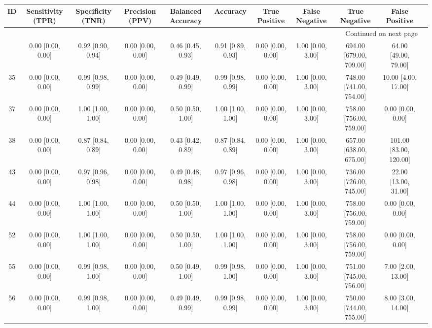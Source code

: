 \documentclass[8pt]{article}
\begin{document}
\begin{center}
\begin{footnotesize}
\begin{longtable}{|ccccccccccc|}
\toprule
 ID &  Sensitivity (TPR) &  Specificity (TNR) &    Precision (PPV) &  Balanced Accuracy &           Accuracy &      True Positive &     False Negative &            True Negative &          False Positive \\
\midrule
\endhead
\midrule
\multicolumn{10}{r}{{Continued on next page}} \\
\midrule
\endfoot

\bottomrule
\endlastfoot
 33 &  0.00 [0.00, 0.00] &  0.92 [0.90, 0.94] &  0.00 [0.00, 0.00] &  0.46 [0.45, 0.93] &  0.91 [0.89, 0.93] &  0.00 [0.00, 0.00] &  1.00 [0.00, 3.00] &  694.00 [679.00, 709.00] &    64.00 [49.00, 79.00] \\
 35 &  0.00 [0.00, 0.00] &  0.99 [0.98, 0.99] &  0.00 [0.00, 0.00] &  0.49 [0.49, 0.99] &  0.99 [0.98, 0.99] &  0.00 [0.00, 0.00] &  1.00 [0.00, 3.00] &  748.00 [741.00, 754.00] &     10.00 [4.00, 17.00] \\
 37 &  0.00 [0.00, 0.00] &  1.00 [1.00, 1.00] &  0.00 [0.00, 0.00] &  0.50 [0.50, 1.00] &  1.00 [1.00, 1.00] &  0.00 [0.00, 0.00] &  1.00 [0.00, 3.00] &  758.00 [756.00, 759.00] &       0.00 [0.00, 0.00] \\
 38 &  0.00 [0.00, 0.00] &  0.87 [0.84, 0.89] &  0.00 [0.00, 0.00] &  0.43 [0.42, 0.89] &  0.87 [0.84, 0.89] &  0.00 [0.00, 0.00] &  1.00 [0.00, 3.00] &  657.00 [638.00, 675.00] &  101.00 [83.00, 120.00] \\
 43 &  0.00 [0.00, 0.00] &  0.97 [0.96, 0.98] &  0.00 [0.00, 0.00] &  0.49 [0.48, 0.98] &  0.97 [0.96, 0.98] &  0.00 [0.00, 0.00] &  1.00 [0.00, 3.00] &  736.00 [726.00, 745.00] &    22.00 [13.00, 31.00] \\
 44 &  0.00 [0.00, 0.00] &  1.00 [1.00, 1.00] &  0.00 [0.00, 0.00] &  0.50 [0.50, 1.00] &  1.00 [1.00, 1.00] &  0.00 [0.00, 0.00] &  1.00 [0.00, 3.00] &  758.00 [756.00, 759.00] &       0.00 [0.00, 0.00] \\
 52 &  0.00 [0.00, 0.00] &  1.00 [1.00, 1.00] &  0.00 [0.00, 0.00] &  0.50 [0.50, 1.00] &  1.00 [1.00, 1.00] &  0.00 [0.00, 0.00] &  1.00 [0.00, 3.00] &  758.00 [756.00, 759.00] &       0.00 [0.00, 0.00] \\
 55 &  0.00 [0.00, 0.00] &  0.99 [0.98, 1.00] &  0.00 [0.00, 0.00] &  0.50 [0.49, 1.00] &  0.99 [0.98, 1.00] &  0.00 [0.00, 0.00] &  1.00 [0.00, 3.00] &  751.00 [745.00, 756.00] &      7.00 [2.00, 13.00] \\
 56 &  0.00 [0.00, 0.00] &  0.99 [0.98, 1.00] &  0.00 [0.00, 0.00] &  0.49 [0.49, 0.99] &  0.99 [0.98, 0.99] &  0.00 [0.00, 0.00] &  1.00 [0.00, 3.00] &  750.00 [744.00, 755.00] &      8.00 [3.00, 14.00] \\
\end{longtable}
\end{footnotesize}
\end{center}
\end{document}
